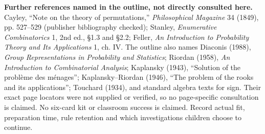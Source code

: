 \documentclass[11pt]{article}
\begin{document}
\textbf{Further references named in the outline, not directly consulted here.} Cayley, ``Note on the theory of permutations,'' \emph{Philosophical Magazine} 34 (1849), pp. 527--529 (publisher bibliography checked); Stanley, \emph{Enumerative Combinatorics} 1, 2nd ed., \S1.3 and \S2.2; Feller, \emph{An Introduction to Probability Theory and Its Applications} 1, ch. IV. The outline also names Diaconis (1988), \emph{Group Representations in Probability and Statistics}; Riordan (1958), \emph{An Introduction to Combinatorial Analysis}; Kaplansky (1943), ``Solution of the probl\`eme des m\'enages''; Kaplansky--Riordan (1946), ``The problem of the rooks and its applications''; Touchard (1934), and standard algebra texts for sign. Their exact page locators were not supplied or verified, so no page-specific consultation is claimed. No six-card kit or classroom success is claimed. Record actual fit, preparation time, rule retention and which investigations children choose to continue.
\end{document}
